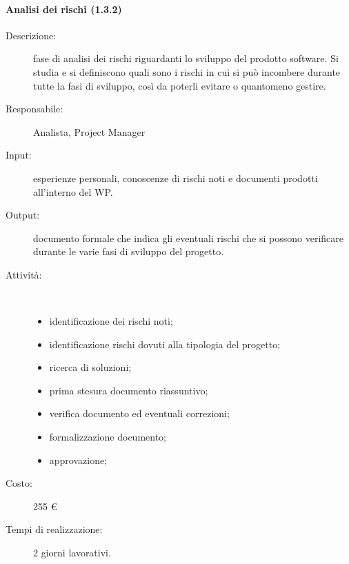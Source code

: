 \paragraph{Analisi dei rischi (1.3.2)}
\begin{description}
\item[Descrizione:] fase di analisi dei rischi riguardanti lo sviluppo del prodotto software. Si studia e si definiscono quali sono i rischi in cui si pu\`{o} incombere durante tutte la fasi di sviluppo, cos\`{i} da poterli evitare o quantomeno gestire.
\item[Responsabile:] Analista, Project Manager
\item[Input:] esperienze personali, conoscenze di rischi noti e documenti prodotti all'interno del WP.
\item[Output:] documento formale che indica gli eventuali rischi che si possono verificare durante le varie fasi di sviluppo del progetto.
\item[Attività:]\mbox{}\\[-1.5\baselineskip]
	\begin{itemize}
	\item identificazione dei rischi noti;
	\item identificazione rischi dovuti alla tipologia del progetto;
	\item ricerca di soluzioni;
	\item prima stesura documento riassuntivo;
	\item verifica documento ed eventuali correzioni;
	\item formalizzazione documento;
	\item approvazione;
	\end{itemize}
\item[Costo:] 255 \euro{}
\item[Tempi di realizzazione:] 2 giorni lavorativi.
\end{description}

